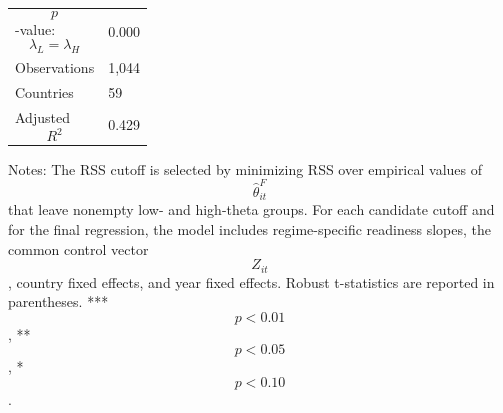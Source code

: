 \begin{table}[H]
\begin{threeparttable}
\begin{tabularx}{\textwidth}{lY}
$$p$$-value: $$\lambda_L=\lambda_H$$ & 0.000 \\
Observations & 1,044 \\
Countries & 59 \\
Adjusted $$R^2$$ & 0.429 \\
\bottomrule
\end{tabularx}
\begin{tablenotes}[flushleft]\footnotesize
\item Notes: The RSS cutoff is selected by minimizing RSS over empirical values of $$\widehat{\theta}^{F}_{it}$$ that leave nonempty low- and high-theta groups. For each candidate cutoff and for the final regression, the model includes regime-specific readiness slopes, the common control vector $$Z_{it}$$, country fixed effects, and year fixed effects. Robust t-statistics are reported in parentheses. *** $$p<0.01$$, ** $$p<0.05$$, * $$p<0.10$$.
\end{tablenotes}
\end{threeparttable}
\end{table}
